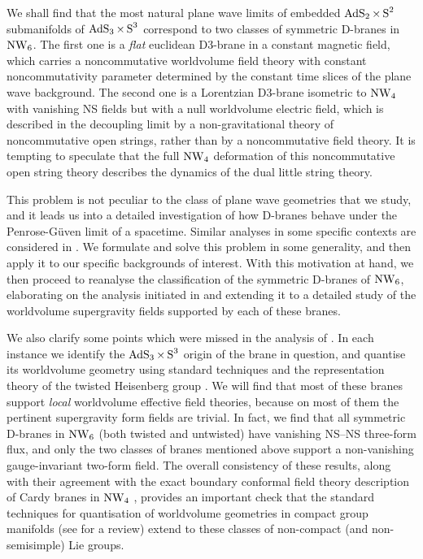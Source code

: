 We shall find that the most natural plane wave limits of embedded
$\operatorname{AdS}_2\times\operatorname{S}^2$ submanifolds of $\operatorname{AdS}_3\times\operatorname{S}^3$ correspond to two classes
of symmetric D-branes in $\operatorname{NW}_6$. The first one is a {\it flat} euclidean
D3-brane in a constant magnetic field, which carries a noncommutative
worldvolume field theory with constant noncommutativity parameter determined by
the constant time slices of the plane wave background. The second one is a
Lorentzian D3-brane isometric to $\operatorname{NW}_4$ with vanishing NS fields but with a
null worldvolume electric field, which is described in the decoupling limit by a
non-gravitational theory of noncommutative open strings, rather than by a
noncommutative field theory. It is tempting to speculate that the full $\operatorname{NW}_4$
deformation of this noncommutative open string theory describes the dynamics of
the dual little string theory.

This problem is not peculiar to the class of plane wave geometries that we
study, and it leads us into a detailed investigation of how D-branes behave
under the Penrose-G\"uven limit of a spacetime. Similar analyses in some
specific contexts are considered in \cite{DK2,SZ1,SF1}. We formulate and solve
this problem in some generality, and then apply it to our specific backgrounds
of interest. With this motivation at hand, we then proceed to reanalyse the
classification of the symmetric D-branes of $\operatorname{NW}_6$, elaborating on the analysis
initiated in \cite{FS1,SF1} and extending it to a detailed study of the
worldvolume supergravity fields supported by each of these branes.

We also clarify some points which were missed in the analysis of \cite{SF1}. In
each instance we identify the $\operatorname{AdS}_3\times\operatorname{S}^3$ origin of the brane in
question, and quantise its worldvolume geometry using standard techniques and
the representation theory of the twisted Heisenberg group
\cite{BAKZ1,CFS1,KK1,Streater1}. We will find that most of these branes support
{\it local} worldvolume effective field theories, because on most of them the
pertinent supergravity form fields are trivial. In fact, we find that all
symmetric D-branes in $\operatorname{NW}_6$ (both twisted and untwisted) have vanishing NS--NS
three-form flux, and only the two classes of branes mentioned above support a
non-vanishing gauge-invariant two-form field. The overall consistency of these
results, along with their agreement with the exact boundary conformal field
theory description of Cardy branes in $\operatorname{NW}_4$ \cite{DK2}, provides an important
check that the standard techniques for quantisation of worldvolume geometries in
compact group manifolds (see \cite{Schom1} for a review) extend to these classes
of non-compact (and non-semisimple) Lie groups.

